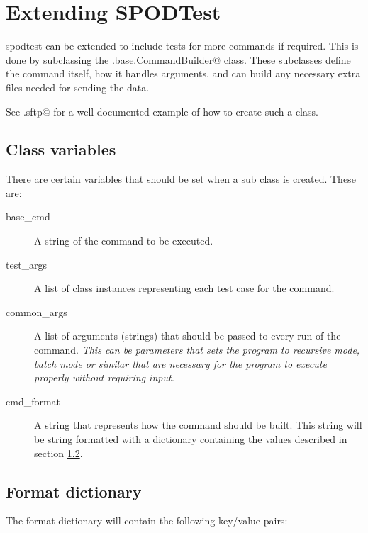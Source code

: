 \section{Extending SPODTest}

\gls{spodtest} can be extended to include tests for more commands if required.
This is done by subclassing the \verb@testers.base.CommandBuilder@ class. These
subclasses define the command itself, how it handles arguments, and can build
any necessary extra files needed for sending the data.

See \verb@testers.sftp@ for a well documented example of how to create such a
class.

\subsection{Class variables}

There are certain variables that should be set when a \verb@CommandBuilder@ sub
class is created. These are:

\begin{description}
    \item[base\_cmd] A string of the command to be executed.
    \item[test\_args] A list of \verb@Args@ class instances representing each
        test case for the command.
    \item[common\_args] A list of arguments (strings) that should be passed to
        every run of the command. \textit{This can be parameters that sets the
        program to recursive mode, batch mode or similar that are necessary for
        the program to execute properly without requiring input.}
    \item[cmd\_format] A string that represents how the command should be
        built. This string will be
        \href{http://docs.python.org/library/stdtypes.html#string-formatting}{string
        formatted} with a dictionary containing the values described in section
        \ref{sec:format_dict}.
\end{description}

\subsection{Format dictionary}
\label{sec:format_dict}

The format dictionary will contain the following key/value pairs:

